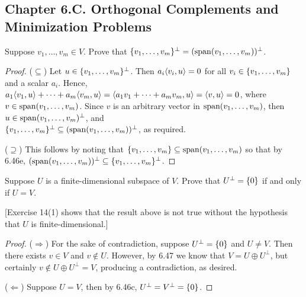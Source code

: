 \subsection*{Chapter 6.C. Orthogonal Complements and Minimization Problems}


\begin{exercise}{1}
  Suppose $v_1,\dots,v_m\in V$. Prove that $\{v_1,\dots,v_m\}^\perp =(\operatorname*{span}(v_1,\dots,v_m))^\perp$.
\end{exercise}
\begin{proof}
 ($\subseteq$) Let $u\in\{v_1,\dots,v_m\}^\perp$. Then $a_i\langle v_i,u\rangle=0$ for all $v_i\in\{v_1,\dots,v_m\}$ and a scalar $a_i$. Hence, $a_1\langle v_1,u\rangle+\dots+a_m\langle v_m,u\rangle =\langle a_1v_1+\dots+a_mv_m,u\rangle =\langle v,u\rangle =0$, where $v\in\operatorname*{span}(v_1,\dots,v_m)$. Since $v$ is an arbitrary vector in $\operatorname*{span}(v_1,\dots,v_m)$, then $u\in\operatorname*{span}(v_1,\dots,v_m)^\perp$, and \\${\{v_1,\dots,v_m\}^\perp \subseteq(\operatorname*{span}(v_1,\dots,v_m))^\perp}$, as required.

 ($\supseteq$) This follows by noting that $\{v_1,\dots,v_m\}\subseteq\operatorname*{span}(v_1,\dots,v_m)$ so that by 6.46e, $(\operatorname*{span}(v_1,\dots,v_m))^\perp\subseteq\{v_1,\dots,v_m\}^\perp$.
\end{proof}

\begin{exercise}{2}
  Suppose $U$ is a finite-dimensional subspace of $V$. Prove that $U^\perp=\{0\}$ if and only if $U=V$.

  [Exercise 14(1) shows that the result above is not true without the hypothesis that $U$ is finite-dimensional.]
\end{exercise}
\begin{proof}
 ($\Rightarrow$) For the sake of contradiction, suppose $U^\perp=\{0\}$ and $U\neq V$. Then there exists $v\in V$ and $v\notin U$. However, by 6.47 we know that $V=U\oplus U^\perp$, but certainly $v\notin U\oplus U^\perp=V$, producing a contradiction, as desired.

 ($\Leftarrow$) Suppose $U=V$, then by 6.46c, $U^\perp=V^\perp=\{0\}$.
\end{proof}

